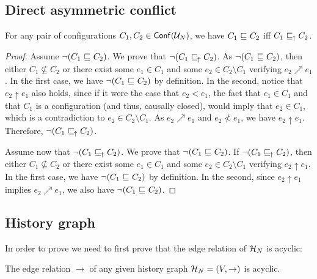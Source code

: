\subsection{Direct asymmetric conflict}

\setcounter{theorem}{11}
\begin{proposition}
For any pair of configurations $C_1, C_2 \in \mathsf{Conf}(\mathcal{U}_{N})$, we have $C_1
{\ \sqsubseteq \ } C_2$ iff $C_1 {\ \sqsubseteq \ }_{\!\!\!\uparrow}\; C_2$.
\end{proposition}

\begin{proof}
Assume $\lnot (C_1 {\ \sqsubseteq \ } C_2)$. We prove that $\lnot (C_1 {\ \sqsubseteq \ }_{\!\!\!\uparrow}\; C_2)$.
As $\lnot (C_1 {\ \sqsubseteq \ } C_2)$, then either $C_1 \not\subseteq C_2$ or there
exist some $e_1 \in C_1$ and some $e_2 \in C_2 \setminus C_1$ verifying $e_2
\nearrow e_1$.  In the first case, we have $\lnot (C_1 {\ \sqsubseteq \ } C_2)$ by
definition.  In the second, notice that $e_2 \uparrow e_1$ also holds, since if
it were the case that $e_2 < e_1$, the fact that $e_1 \in C_1$ and that $C_1$
is a configuration (and thus, causally closed), would imply that $e_2 \in C_1$,
which is a contradiction to $e_2 \in C_2 \setminus C_1$.  As $e_2 \nearrow e_1$
and $e_2 \not < e_1$, we have $e_2 \uparrow e_1$.  Therefore, $\lnot (C_1
{\ \sqsubseteq \ }_{\!\!\!\uparrow}\; C_2)$.

Assume now that $\lnot (C_1 {\ \sqsubseteq \ }_{\!\!\!\uparrow}\; C_2)$.  We prove that $\lnot (C_1
{\ \sqsubseteq \ } C_2)$.  If $\lnot (C_1 {\ \sqsubseteq \ }_{\!\!\!\uparrow}\; C_2)$, then either $C_1 \not\subseteq
C_2$ or there exist some $e_1 \in C_1$ and some $e_2 \in C_2 \setminus C_1$
verifying $e_2 \uparrow e_1$.  In the first case, we have $\lnot (C_1 {\ \sqsubseteq \ }
C_2)$ by definition.  In the second, since $e_2 \uparrow e_1$ implies $e_2
\nearrow e_1$, we also have $\lnot (C_1 {\ \sqsubseteq \ } C_2)$.
\end{proof}

\subsection{History graph}

In order to prove  we need to first prove that the edge
relation of $\mathcal{H}_{N}$ is acyclic:

\setcounter{theorem}{17}
\begin{lemma}
\label{lem:the.edge}
The edge relation $\to$ of any given history graph $\mathcal{H}_{N} = (V, \to)$ is
acyclic.
\end{lemma}

